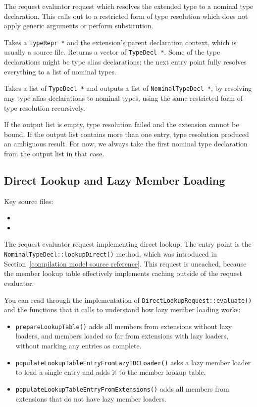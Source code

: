 \documentclass[../generics]{subfiles}
\begin{document}
The request evaluator request which resolves the extended type to a nominal type declaration. This calls out to a restricted form of type resolution which does not apply generic arguments or perform substitution.

Takes a \texttt{TypeRepr *} and the extension's parent declaration context, which is usually a source file. Returns a vector of \texttt{TypeDecl *}. Some of the type declarations might be type alias declarations; the next entry point fully resolves everything to a list of nominal types.

Takes a list of \texttt{TypeDecl *} and outputs a list of \texttt{NominalTypeDecl *}, by resolving any type alias declarations to nominal types, using the same restricted form of type resolution recursively.

If the output list is empty, type resolution failed and the extension cannot be bound. If the output list contains more than one entry, type resolution produced an ambiguous result. For now, we always take the first nominal type declaration from the output list in that case.

\subsection*{Direct Lookup and Lazy Member Loading}

Key source files:
\begin{itemize}
\item {}
\item {}
\end{itemize}

The request evaluator request implementing direct lookup. The entry point is the \texttt{NominalTypeDecl::lookupDirect()} method, which was introduced in Section~\ref{compilation model source reference}. This request is uncached, because the member lookup table effectively implements caching outside of the request evaluator.

You can read through the implementation of \verb|DirectLookupRequest::evaluate()| and the functions that it calls to understand how lazy member loading works:
\begin{itemize}
\item \texttt{prepareLookupTable()} adds all members from extensions without lazy loaders, and members loaded so far from extensions with lazy loaders, without marking any entries as complete.
\item \texttt{populateLookupTableEntryFromLazyIDCLoader()} asks a lazy member loader to load a single entry and adds it to the member lookup table.
\item \texttt{populateLookupTableEntryFromExtensions()} adds all members from extensions that do not have lazy member loaders.
\end{itemize}
\end{document}
